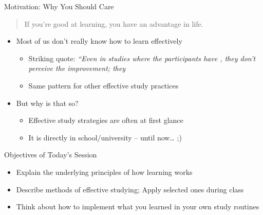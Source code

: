 \documentclass{ercisbeamer}
\begin{document}
\begin{frame}{Motivation: Why You Should Care}
    \begin{quote}
    If you're good at learning, you have an advantage in life. 
    \end{quote}
    \vspace{1em}
    \begin{itemize}
        \item Most of us don't really know how to learn effectively
        \begin{itemize}
            \item Striking quote: \emph{``Even in studies where the participants have , they don't perceive the improvement; they  }
            \item Same pattern for other effective study practices
        \end{itemize}
        \item But why is that so?
        \begin{itemize}
            \item Effective study strategies are often  at first glance
            \item It is  directly  in school/university -- until now… ;)
        \end{itemize}
    \end{itemize}
\end{frame}

\begin{frame}{Objectives of Today's Session}
    \begin{itemize}
        \item Explain the underlying principles of how learning works
        \item Describe methods of effective studying; Apply selected ones during class
        \item Think about how to implement what you learned in your own study routines
    \end{itemize}
\end{frame}
\end{document}
